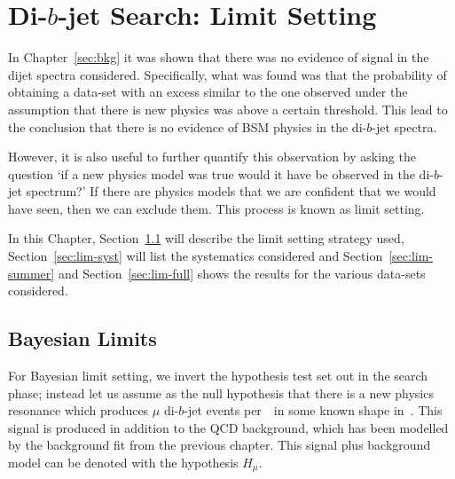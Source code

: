 \chapter{Di-$b$-jet Search: Limit Setting}
\label{sec:lim}

In Chapter~\ref{sec:bkg} it was shown that there was no evidence of signal in the dijet spectra considered.
Specifically, what was found was that the probability of obtaining a data-set with an excess similar to the one observed
under the assumption that there is new physics was above a certain threshold.
This lead to the conclusion that there is no evidence of BSM physics in the di-$b$-jet spectra.

However, it is also useful to further quantify this observation by asking the question
`if a new physics model was true would it have be observed in the di-$b$-jet spectrum?'
If there are physics models that we are confident that we would have seen, then we can exclude them.
This process is known as limit setting.

In this Chapter,
Section~\ref{sec:lim-strat} will describe the limit setting strategy used,
Section~\ref{sec:lim-syst} will list the systematics considered
and Section~\ref{sec:lim-summer} and Section~\ref{sec:lim-full}
shows the results for the various data-sets considered.


\section{Bayesian Limits}
\label{sec:lim-strat}

For Bayesian limit setting, we invert the hypothesis test set out in the search phase;
instead let us assume as the null hypothesis that there is a new physics resonance
which produces $\mu$ di-$b$-jet events per~\ifb~in some known shape in~\mjj.
This signal is produced in addition to the QCD background,
which has been modelled by the background fit from the previous chapter.
This signal plus background model can be denoted with the hypothesis $H_\mu$.


